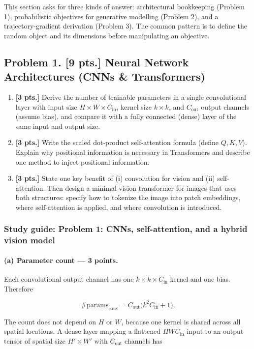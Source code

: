 \documentclass[11pt,a4paper]{article}
\begin{document}
This section asks for three kinds of answer: architectural bookkeeping (Problem 1), probabilistic objectives for generative modelling (Problem 2), and a trajectory-gradient derivation (Problem 3). The common pattern is to define the random object and its dimensions before manipulating an objective.



\subsection{Problem 1. [9 pts.] Neural Network Architectures (CNNs \& Transformers)}
\begin{enumerate}[label=(\alph*)]
    \item \textbf{[3 pts.]} Derive the number of trainable parameters in a single convolutional layer with input size $H \times W \times C_{\mathrm{in}}$, kernel size $k \times k$, and $C_{\mathrm{out}}$ output channels (assume bias), and compare it with a fully connected (dense) layer of the same input and output size.
    \item \textbf{[3 pts.]} Write the scaled dot-product self-attention formula (define $Q, K, V$). Explain why positional information is necessary in Transformers and describe one method to inject positional information.
    \item \textbf{[3 pts.]} State one key benefit of (i) convolution for vision and (ii) self-attention. Then design a minimal vision transformer for images that uses both structures: specify how to tokenize the image into patch embeddings, where self-attention is applied, and where convolution is introduced.
\end{enumerate}


\subsubsection{Study guide: Problem 1: CNNs, self-attention, and a hybrid vision model}

\paragraph{(a) Parameter count --- 3 points.}

Each convolutional output channel has one $k\times k\times C_{\mathrm{in}}$ kernel and one bias. Therefore

\[
\#\mathrm{params}_{\mathrm{conv}}
=C_{\mathrm{out}}\bigl(k^2C_{\mathrm{in}}+1\bigr).
\]

The count does not depend on $H$ or $W$, because one kernel is shared across all spatial locations. A dense layer mapping a flattened $HWC_{\mathrm{in}}$ input to an output tensor of spatial size $H'\times W'$ with $C_{\mathrm{out}}$ channels has
\end{document}
